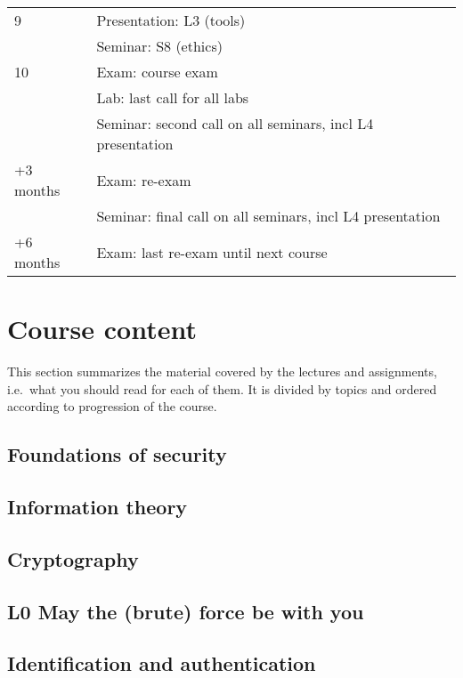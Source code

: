 \begin{table}
\begin{tabular}{lp{9cm}}
    \midrule
    9
    & Presentation: L3 (tools)\\
    & Seminar: S8 (ethics)\\
    \midrule
    10
    & Exam: course exam\\
    & Lab: last call for all labs\\
    & Seminar: second call on all seminars, incl L4 presentation\\
    \midrule
    +3 months
    & Exam: re-exam\\
    & Seminar: final call on all seminars, incl L4 presentation\\
    \midrule
    +6 months
    & Exam: last re-exam until next course\\
    \bottomrule
  \end{tabular}
\end{table}


\section{Course content}

This section summarizes the material covered by the lectures and assignments, 
i.e.\ what you should read for each of them.
It is divided by topics and ordered according to progression of the course.

\subsection{Foundations of security}


\subsection{Information theory}


\subsection{Cryptography}


\subsection{L0 May the (brute) force be with you}


\subsection{Identification and authentication}


